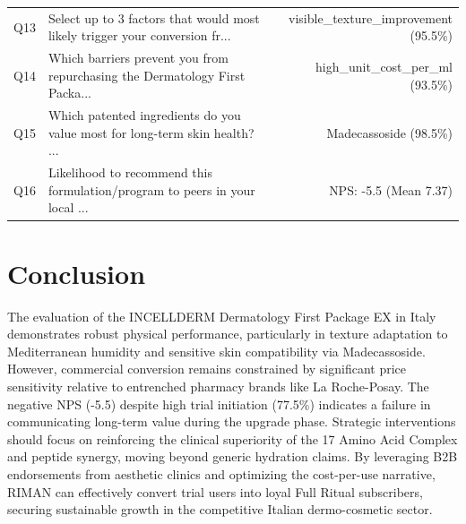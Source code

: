 \documentclass[10pt,twocolumn,a4paper]{article}
\begin{document}
\begin{table}[t]
\begin{tabularx}{\textwidth}{l X r}
Q13 & Select up to 3 factors that would most likely trigger your conversion fr... & visible\_texture\_improvement (95.5\%) \\
Q14 & Which barriers prevent you from repurchasing the Dermatology First Packa... & high\_unit\_cost\_per\_ml (93.5\%) \\
Q15 & Which patented ingredients do you value most for long-term skin health? ... & Madecassoside (98.5\%) \\
Q16 & Likelihood to recommend this formulation/program to peers in your local ... & NPS: -5.5 (Mean 7.37) \\
\bottomrule
\end{tabularx}
\end{table}

\section{Conclusion}
The evaluation of the INCELLDERM Dermatology First Package EX in Italy demonstrates robust physical performance, particularly in texture adaptation to Mediterranean humidity and sensitive skin compatibility via Madecassoside. However, commercial conversion remains constrained by significant price sensitivity relative to entrenched pharmacy brands like La Roche-Posay. The negative NPS (-5.5) despite high trial initiation (77.5\%) indicates a failure in communicating long-term value during the upgrade phase. Strategic interventions should focus on reinforcing the clinical superiority of the 17 Amino Acid Complex and peptide synergy, moving beyond generic hydration claims. By leveraging B2B endorsements from aesthetic clinics and optimizing the cost-per-use narrative, RIMAN can effectively convert trial users into loyal Full Ritual subscribers, securing sustainable growth in the competitive Italian dermo-cosmetic sector.
\end{document}

